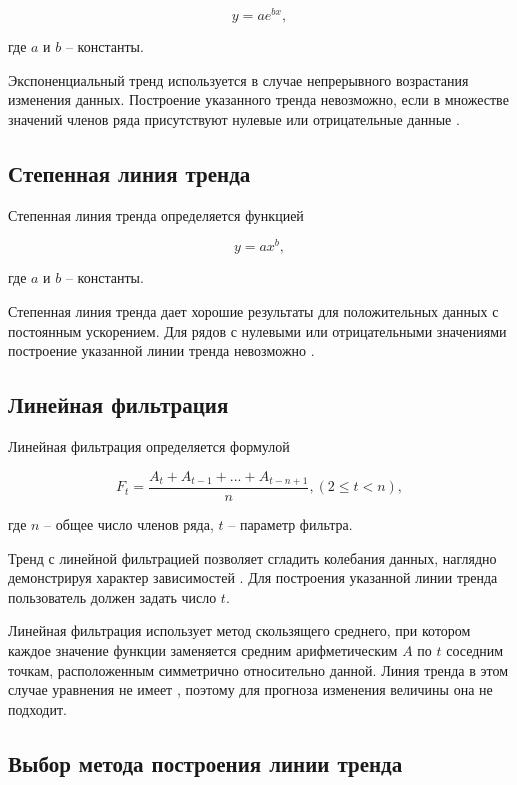 \documentclass[a4paper,14pt]{extreport}
\begin{document}
\begin{equation}
	y = a e ^ {bx},
\end{equation}

где $a$ и $b$ -- константы.

Экспоненциальный тренд используется в случае непрерывного возрастания изменения данных. Построение указанного тренда не­возможно, если в множестве значений членов ряда присутствуют нулевые или отрицательные данные \cite{lt_exel}.

\subsection{Степенная линия тренда}

Степенная линия тренда определяется функцией

\begin{equation}
	y = a x ^ b,
\end{equation}

где $a$ и $b$ -- константы.

Степенная линия тренда дает хорошие результаты для положительных данных с постоянным ускорением. Для рядов с нулевыми или отрицательными значениями построение указанной линии трен­да невозможно \cite{lt_exel}.

\subsection{Линейная фильтрация}

Линейная фильтрация определяется формулой

\begin{equation}
	F_t = \frac{A_t + A_{t-1} + ... + A_{t-n+1}}{n}, (2 \leqslant t < n),
\end{equation}

где $n$ -- общее число членов ряда, $t$ -- параметр фильтра.

Тренд с линейной фильтрацией позволяет сгладить колебания данных, наглядно демонстрируя характер зависимостей \cite{lt_exel}. Для построения указанной линии тренда пользователь должен задать число $t$.

Линейная фильтрация использует метод скользящего среднего, при котором каждое значение функции заменяется средним арифметическим $A$ по $t$ соседним точкам, расположенным симметрично относительно данной. Линия тренда в этом случае уравнения не имеет \cite{lin_filt}, поэтому для прогноза изменения величины она не подходит.

\subsection{Выбор метода построения линии тренда}
\end{document}
